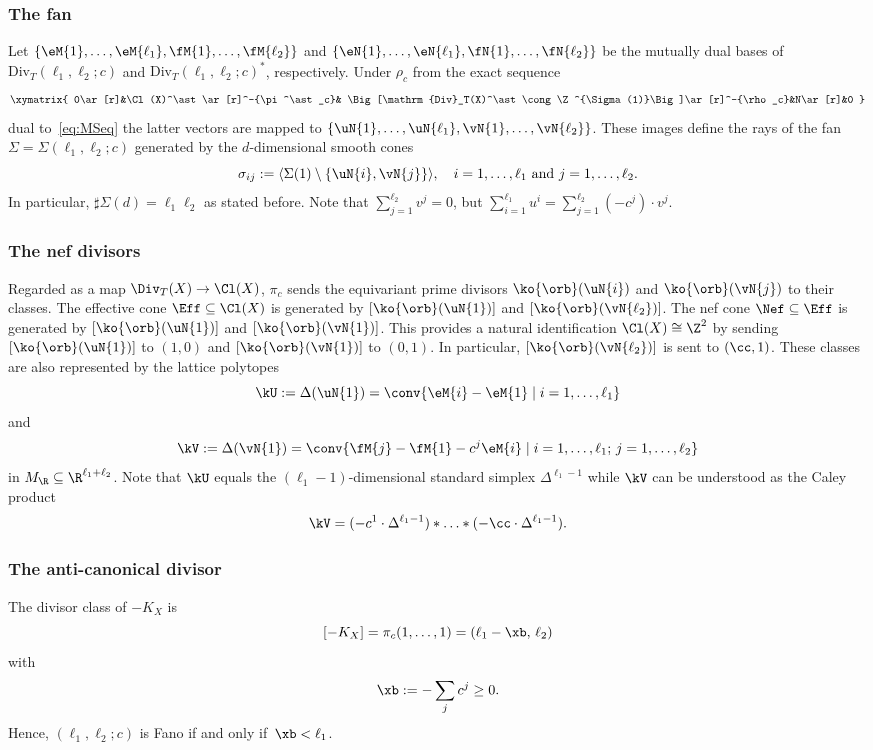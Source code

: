 \subsubsection{The fan}
\label{pic2:fan}
Let $\{\eM{1},\ldots,\eM{\ell_1},
\fM{1},\ldots,\fM{\ell_2}\}$ and
$\{\eN{1},\ldots,\eN{\ell_1},
\fN{1},\ldots,\fN{\ell_2}\}$ be the mutually dual bases 
of $\mathrm{Div}_T(\ell_1,\ell_2;c)$
and $\mathrm{Div}_T(\ell_1,\ell_2;c)^\ast$, respectively. 
Under $\rho_c$ from the exact sequence
$$
\xymatrix{
0\ar[r]&\Cl(X)^\ast\ar[r]^-{\pi^\ast_c}&
\Big[\mathrm{Div}_T(X)^\ast
\cong\Z^{\Sigma(1)}\Big]\ar[r]^-{\rho_c}&N\ar[r]&0
}
$$
dual to~\eqref{eq:MSeq} the latter vectors are mapped 
to $\{\uN{1},\ldots,\uN{\ell_1},\vN{1},
\ldots,\vN{\ell_2}\}$. These images define the rays 
of the fan $\Sigma=\Sigma (\ell_1,\ell_2;c)$ 
generated by the $d$-dimensional smooth cones 
$$
\sigma_{ij}:=\langle\Sigma(1)\setminus\{\uN{i},\vN{j}\}
\rangle,\quad i=1,\ldots,\ell_1\mbox{ and }j=1,\ldots,
\ell_2.
$$ 
In particular, $\sharp\Sigma(d)=\ell_1\ell_2$ as 
stated before.
{Note that $\sum_{j=1}^{\ell_2}v^j=0$, but
$\sum_{i=1}^{\ell_1}u^i=\sum_{j=1}^{\ell_2}(-c^j)\cdot v^j$.
}

\subsubsection{The nef divisors}
\label{pic2:nef}
Regarded as a map $\Div_T(X)\to\Cl(X)$, 
$\pi_c$ sends the equivariant prime divisors
$\ko{\orb}(\uN{i})$ and $\ko{\orb}(\vN{j})$ 
to their classes. {The effective cone 
$\Eff\subseteq\Cl(X)$ is generated by 
$[\ko{\orb}(\uN{1})]$ and $[\ko{\orb}(\vN{\ell_2})]$. 
The nef cone $\Nef\subseteq\Eff$ is generated 
by $[\ko{\orb}(\uN{1})]$ and 
$[\ko{\orb}(\vN{1})]$. This provides a natural 
identification {$\Cl(X)\cong\Z^2$} by sending 
$[\ko{\orb}(\uN{1})]$ to $(1,0)$ and $[\ko{\orb}(\vN{1})]$ 
to $(0,1)$. In particular, $[\ko{\orb}(\vN{\ell_2})]$ 
is sent to $(\cc,1)$. These classes are also represented 
by the lattice polytopes} 
$$
\kU:=\Delta(\uN{1})=\conv\{\eM{i}-\eM{1}\mid 
i=1,\ldots,\ell_1\}
$$
and 
$$
\kV:=\Delta(\vN{1})=
\conv\{\fM{j}-\fM{1}-c^j\eM{i}\mid
i=1,\ldots,\ell_1;\, j=1,\ldots, \ell_2\}
$$
in $M_\R\subseteq\R^{\ell_1+\ell_2}$. Note 
that $\kU$ equals the $(\ell_1-1)$-dimensional
standard simplex $\Delta^{\ell_1-1}$ while $\kV$ 
can be understood as the Caley product
$$
\kV=(-c^1\cdot \Delta^{\ell_1-1})*\ldots
*(-\cc\cdot \Delta^{\ell_1-1}).
$$

\subsubsection{The anti-canonical divisor}
\label{pic2:can}
The divisor class of $-K_X$ is 
$$
[-K_X]=\pi_c(1,\ldots,1)=(\ell_1-\xb,\,\ell_2)
$$
with 
$$
\xb:=-\sum_j c^j\geq 0.
$$
Hence, $(\ell_1,\ell_2;c)$ is Fano if and 
only if $\,\xb<\ell_1$.

